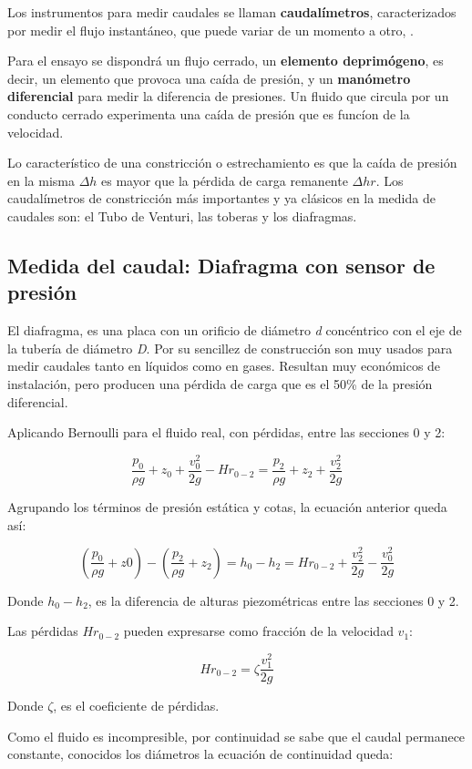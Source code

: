 Los instrumentos para medir caudales se llaman \textbf{caudalímetros},
caracterizados por medir el flujo instantáneo, que puede variar de un
momento a otro, \cite{Mataix82}.


Para el ensayo se dispondrá un flujo cerrado, un \textbf{elemento
deprimógeno}, es decir, un elemento que provoca una caída de presión, y
un \textbf{manómetro diferencial} para medir la diferencia de presiones.
Un fluido que circula por un conducto cerrado experimenta una caída de
presión que es funcíon de la velocidad.

Lo característico de una constricción o estrechamiento es que la caída
de presión en la misma \(\Delta h\) es mayor que la pérdida de carga
remanente \(\Delta hr\). Los caudalímetros de constricción más
importantes y ya clásicos en la medida de caudales son: el Tubo de
Venturi, las toberas y los diafragmas.

\subsection{Medida del caudal: Diafragma con sensor de
presión}\label{header-n54}

El diafragma, es una placa con un orificio de diámetro \emph{d}
concéntrico con el eje de la tubería de diámetro \emph{D}. Por su
sencillez de construcción son muy usados para medir caudales tanto en
líquidos como en gases. Resultan muy económicos de instalación, pero
producen una pérdida de carga que es el 50\% de la presión diferencial.

Aplicando Bernoulli para el fluido real, con pérdidas, entre las
secciones 0 y 2:


\[\frac{p_{0}}{\rho g}+z_{0}+\frac{v_{0}^2}{2g}-Hr_{0-2}=\frac{p_{2}}{\rho g}+z_{2}+\frac{v_{2}^2}{2g}\]


Agrupando los términos de presión estática y cotas, la ecuación anterior
queda así:

\[(\frac{p_{0}}{\rho g}+z{0})-(\frac{p_{2}}{\rho g}+z_{2})=h_{0}-h_{2}=Hr_{0-2}+\frac{v_{2}^2}{2g}-\frac{v_{0}^2}{2g}\]

Donde \(h_0-h_{2}\), es la diferencia de alturas piezométricas entre las
secciones 0 y 2.

Las pérdidas \(Hr_{0-2}\) pueden expresarse como fracción de la
velocidad \(v_1\):

\[Hr_{0-2}=\zeta \frac{v_{1}^2}{2g}\]

Donde \(\zeta\), es el coeficiente de pérdidas.

Como el fluido es incompresible, por continuidad se sabe que el caudal
permanece constante, conocidos los diámetros la ecuación de continuidad
queda:

